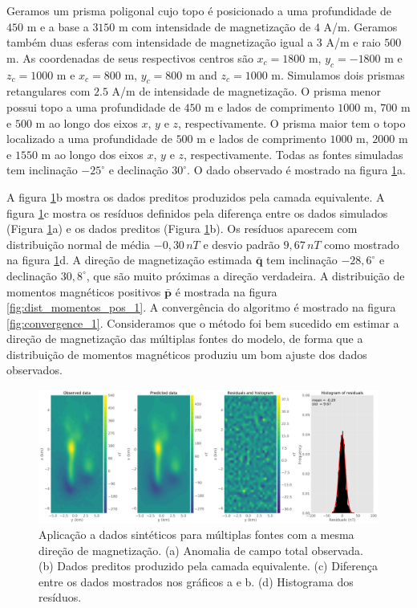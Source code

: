 Geramos um prisma poligonal cujo topo é posicionado a uma profundidade de $450$ m e a base a $3150$ m com intensidade de magnetização de $4$ A/m. Geramos também duas esferas com intensidade de magnetização igual a $3$ A/m e raio $500$ m. As coordenadas de seus respectivos centros são $x_c = 1800$ m, $y_c = -1800$ m e $z_c = 1000$ m e $x_c = 800$ m, $y_c = 800$ m and $z_c= 1000$ m. Simulamos dois prismas retangulares com $2.5$ A/m de intensidade de magnetização. O prisma menor possui topo a uma profundidade de $450$ m e lados de comprimento $1000$ m, $700$ m e $500$ m ao longo dos eixos $x$, $y$ e $z$, respectivamente. O prisma maior tem o topo localizado a uma profundidade de $500$ m e lados de comprimento $1000$ m, $2000$ m e $1550$ m ao longo dos eixos $x$, $y$ e $z$, respectivamente. Todas as fontes simuladas tem inclinação $-25^\circ$ e declinação $30^\circ$. O dado observado é mostrado na figura \ref{fig:data_fitting_1}a.

A figura \ref{fig:data_fitting_1}b mostra os dados preditos produzidos pela camada equivalente. A figura \ref{fig:data_fitting_1}c mostra os resíduos definidos pela diferença entre os dados simulados (Figura \ref{fig:data_fitting_1}a) e os dados preditos (Figura \ref{fig:data_fitting_1}b). Os resíduos aparecem com distribuição normal de média $-0,30 \, nT$ e desvio padrão $9,67 \, nT$ como mostrado na figura \ref{fig:data_fitting_1}d. A direção de magnetização estimada $\bar{\mathbf{q}}$ tem inclinação $-28,6^\circ$ e declinação $30,8^\circ$, que são muito próximas a direção verdadeira. A distribuição de momentos magnéticos positivos $\bar{\mathbf{p}}$ é mostrada na figura \ref{fig:dist_momentos_pos_1}. A convergência do algoritmo é mostrado na figura \ref{fig:convergence_1}. Consideramos que o método foi bem sucedido em estimar a direção de magnetização das múltiplas fontes do modelo, de forma que a distribuição de momentos magnéticos produziu um bom ajuste dos dados observados. 

\begin{figure}
	\centering
	\includegraphics[width=1.1\textwidth]{Fig/eqlayer/unidir_test/data_fitting_LM_NNLS_magRM.png}
	\caption{Aplicação a dados sintéticos para múltiplas fontes com a mesma direção de magnetização. (a) Anomalia de campo total observada. (b) Dados preditos produzido pela camada equivalente. (c) Diferença entre os dados mostrados nos gráficos a e b. (d) Histograma dos resíduos.}
	\label{fig:data_fitting_1}
\end{figure}

